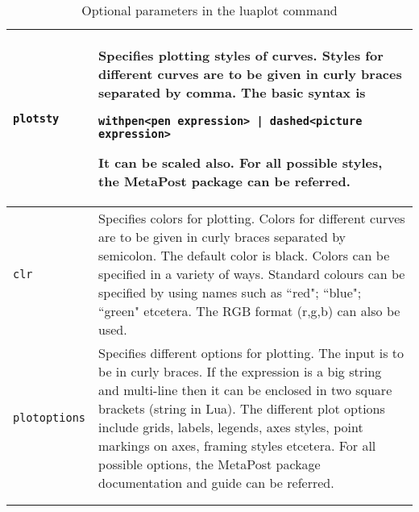 \documentclass{article}
\begin{document}
\begin{center}
\begin{longtable}{lm{11.3cm}}
\midrule
\begin{lstlisting}[caption={[]}]
plotsty
\end{lstlisting}
 & Specifies plotting styles of curves. Styles for different curves are to be given in curly braces separated by comma.   The basic syntax is \begin{lstlisting}[caption={[]}]
withpen<pen expression> | dashed<picture expression>
\end{lstlisting} It can be scaled also. For all possible styles, the MetaPost package \cite{online.metapost} can be referred.\\
\midrule
\begin{lstlisting}[caption={[]}]
clr
\end{lstlisting}
 & Specifies colors for plotting. Colors for different curves are to be given in curly braces separated by semicolon.   The default color is black. Colors can be specified in a variety of ways. Standard colours can be specified by using names such as ``red"; ``blue"; ``green" etcetera. The RGB format (r,g,b) can also be used. \\ 
\midrule
\begin{lstlisting}[caption={[]}]
plotoptions
\end{lstlisting}
 & Specifies different options for plotting. The input is to be in curly braces. If the expression is a big string and multi-line then it can be enclosed in two square brackets (string in Lua). The different plot options include grids, labels, legends, axes styles, point markings on axes, framing styles etcetera. For all possible options, the MetaPost package documentation  \cite{online.metapost}  and guide  \cite{article.hobby} can be referred. \\
\bottomrule \\
\caption{Optional parameters in the luaplot command}
\label{tbl:paraluaplot}
\end{longtable}
\end{center}
\end{document}
